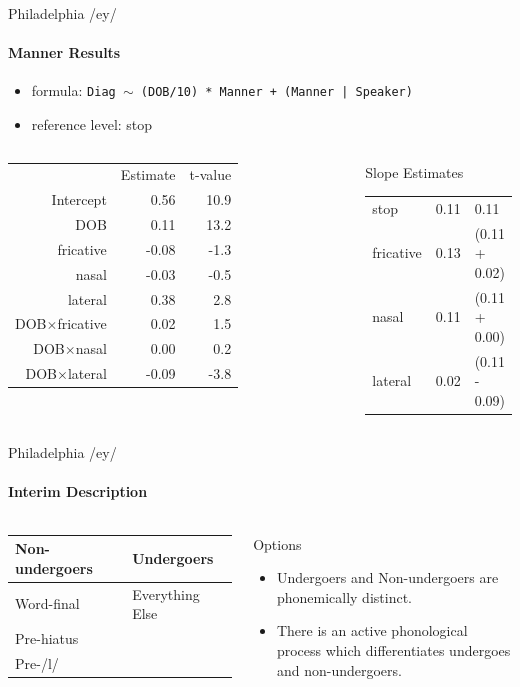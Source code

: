 \documentclass[]{beamer}
\begin{document}
\begin{frame}{Philadelphia /ey/}
	\framesubtitle{Manner Results}
	\begin{itemize}
		\item [] formula: \texttt{\footnotesize Diag $\sim$ (DOB/10) * Manner + (Manner | Speaker)}
		\item [] reference level: stop
	\end{itemize}
	\begin{columns}[c]
		\column{0.49\paperwidth}
	\begin{tabular}{rrr}
		\toprule
		&Estimate & t-value\\
	\cmidrule{2-3}
	Intercept & 0.56 & 10.9\\
	DOB 	  & 0.11 & 13.2\\
	\midrule
	fricative & -0.08 & -1.3\\
	nasal     & -0.03 & -0.5\\
	lateral   & 0.38  & 2.8\\
	\midrule
	DOB$\times$fricative & 0.02 & 1.5\\
	DOB$\times$nasal     & 0.00 & 0.2\\
	DOB$\times$lateral   & -0.09 & -3.8\\
	\bottomrule
	\end{tabular}
		\column{0.49\paperwidth}
		\begin{block}{Slope Estimates}
			\begin{tabular}{lr@{=}l}
				stop & 0.11 & 0.11\\
				fricative & 0.13 & (0.11 + 0.02) \\
				nasal & 0.11 & (0.11 + 0.00) \\
				lateral & 0.02 & (0.11 - 0.09)
			\end{tabular}
		\end{block}
	\end{columns}
\end{frame}





\begin{frame}{Philadelphia /ey/}
	\framesubtitle{Interim Description}
	
	\begin{columns}[c]
		\begin{tabular}{ll}
			Non-undergoers & Undergoers\\
			\midrule
			Word-final & Everything Else\\
			Pre-hiatus & \\
			Pre-/l/ &
			\end{tabular}
		\begin{block}{Options}
			\begin{itemize}
				\item Undergoers and Non-undergoers are phonemically distinct.
				\item There is an active phonological process which differentiates undergoes and non-undergoers.
			\end{itemize}
		\end{block}
	\end{columns}
	
\end{frame}
\end{document}
